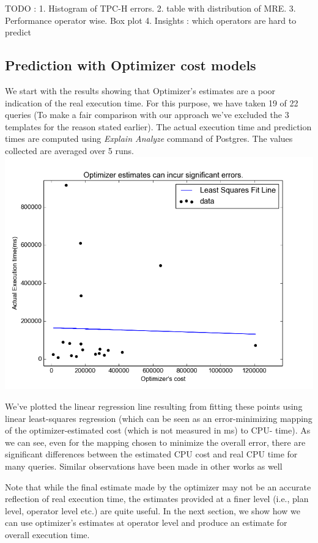 \documentclass{article}
\begin{document}
\begin{multicols}{2}
\begin{itemize}
	TODO : 
	1. Histogram of TPC-H errors.
	2. table with distribution of MRE.
	3. Performance operator wise. Box plot
	4. Insights : which operators are hard to predict
	
	\end{itemize}		
	
	\subsection{Prediction with Optimizer cost models}		
	We start with the results showing that Optimizer's estimates are a poor indication of the real
	execution time. For this purpose, we have taken 19 of 22 queries (To make a fair comparison with 
	our approach we've excluded the 3 templates for the reason stated earlier). The actual execution time
	and prediction times are computed using \textit{Explain Analyze} command of Postgres. The values 			collected are averaged over 5 runs.
	\includegraphics[scale=0.45]{optcost.png}
	
	We've plotted the linear regression line resulting from fitting these points 
	using linear least-squares regression 
	(which can be seen as an error-minimizing mapping of the
	optimizer-estimated cost (which is not measured in ms) to CPU-
	time). As we can see, even for the mapping chosen to minimize
	the overall error, there are significant differences between the estimated CPU cost 
	and real CPU time for many queries. Similar
	observations have been made in other works as well \cite{MSR,ICDE2012}

	Note that while the final estimate made by the optimizer may not be an accurate reflection of
	real execution time, the estimates provided at a finer level (i.e., plan level, operator level etc.) 
	are quite useful. In the next section, we show how we can use optimizer's estimates at operator level 
	and produce an estimate for overall execution time.
		

\end{multicols}
\end{document}
